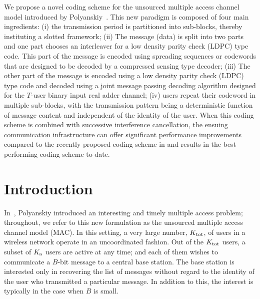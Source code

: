 \newif\iflonger
\longerfalse

We propose a novel coding scheme for the unsourced multiple access channel model introduced by Polyanskiy~\cite{polyanskiy2017perspective}.
This new paradigm is composed of four main ingredients: (i) the transmission period is partitioned into sub-blocks, thereby instituting a slotted framework; (ii) The message (data) is split into two parts and one part chooses an interleaver for a low density parity check (LDPC) type code. This part of the message is encoded using spreading sequences or codewords that are designed to be decoded by a compressed sensing type decoder; (iii) The other part of the message is encoded using a low density parity check (LDPC) type code and decoded using a joint message passing decoding algorithm designed for the $T$-user binary input real adder channel;
(iv) users repeat their codeword in multiple sub-blocks, with the transmission pattern being a deterministic function of message content and independent of the identity of the user. When this coding scheme is combined with successive interference cancellation, the ensuing communication infrastructure can offer significant performance improvements compared to the recently proposed coding scheme in \cite{ordentlich2017low} and results in the best performing coding scheme to date.

\section{Introduction}
In~\cite{polyanskiy2017perspective}, Polyanskiy introduced an interesting and timely multiple access problem; throughout, we refer to this new formulation as the unsourced multiple access channel model (MAC). In this setting, a very large number, $K_{\text{tot}}$, of users in a wireless network operate in an uncoordinated fashion. Out of the $K_{\text{tot}}$ users, a subset of $K_{\text{a}}$ users are active at any time; and each of them wishes to communicate a $B$-bit message to a central base station. The base station is interested only in recovering the list of messages without regard to the identity of the user who transmitted a particular message. In addition to this, the interest is typically in the case when $B$ is small.

